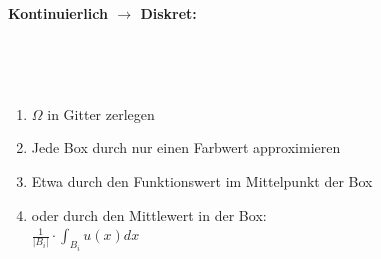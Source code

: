 \documentclass{article}
\theoremstyle{plain}
\theoremstyle{definition}
\numberwithin{equation}{section}
\newcommand{\abs}[1] {
\left| #1 \right|
}
\newcommand{\C}[0]{
    \cdot
}
\newcommand{\pa}[1] {
    \par{\textbf{#1}}
}
\begin{document}
        \pa{Kontinuierlich $\to$ Diskret:}\\
            \begin{minipage}[t]{0.49\linewidth}
                \
                \begin{center}
                \end{center}
            \end{minipage}
            \hfill\vrule\hfill
            \begin{minipage}[t]{0.49\linewidth}
                \
                \begin{center}
                    \begin{enumerate}[label=\textbullet]
                        \item $\Omega$ in Gitter zerlegen
                        \item Jede Box durch nur einen Farbwert approximieren
                        \item Etwa durch den Funktionswert im Mittelpunkt der Box
                        \item oder durch den Mittlewert in der Box:\\ $\displaystyle \frac{1}{\abs{B_i}} \C \int_{B_i}u(x)dx$
                    \end{enumerate}
                \end{center}
            \end{minipage}
\end{document}
